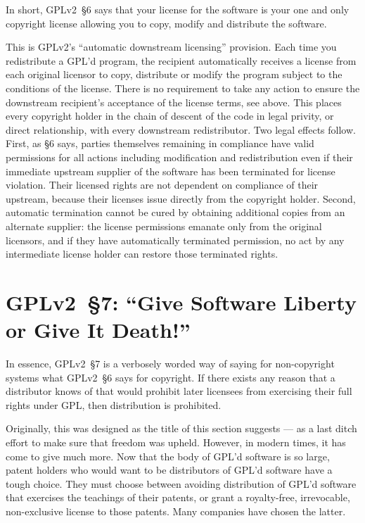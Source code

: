 In short, GPLv2~\S6 says that your license for the software is your one and
only copyright license allowing you to copy, modify and distribute the
software.


This is GPLv2’s ``automatic downstream licensing'' provision. Each time you
redistribute a GPL’d program, the recipient automatically receives a license
from each original licensor to copy, distribute or modify the program subject
to the conditions of the license. There is no requirement to take any action
to ensure the downstream recipient’s acceptance of the license terms, see
above. This places every copyright holder in the chain of descent of the code
in legal privity, or direct relationship, with every downstream
redistributor. Two legal effects follow. First, as \S6 says, parties
themselves remaining in compliance have valid permissions for all actions
including modification and redistribution even if their immediate upstream
supplier of the software has been terminated for license violation. Their
licensed rights are not dependent on compliance of their upstream, because
their licenses issue directly from the copyright holder. Second, automatic
termination cannot be cured by obtaining additional copies from an alternate
supplier: the license permissions emanate only from the original licensors,
and if they have automatically terminated permission, no act by any
intermediate license holder can restore those terminated rights.

\section{GPLv2~\S7: ``Give Software Liberty or Give It Death!''}
\label{GPLv2s7}

In essence, GPLv2~\S7 is a verbosely worded way of saying for non-copyright
systems what GPLv2~\S6 says for copyright.  If there exists any reason that a
distributor knows of that would prohibit later licensees from exercising
their full rights under GPL, then distribution is prohibited.

Originally, this was designed as the title of this section suggests --- as
a last ditch effort to make sure that freedom was upheld.  However, in
modern times, it has come to give much more.  Now that the body of GPL'd
software is so large, patent holders who would want to be distributors of
GPL'd software have a tough choice.  They must choose between avoiding
distribution of GPL'd software that exercises the teachings of their
patents, or grant a royalty-free, irrevocable, non-exclusive license to
those patents.  Many companies have chosen the latter.

